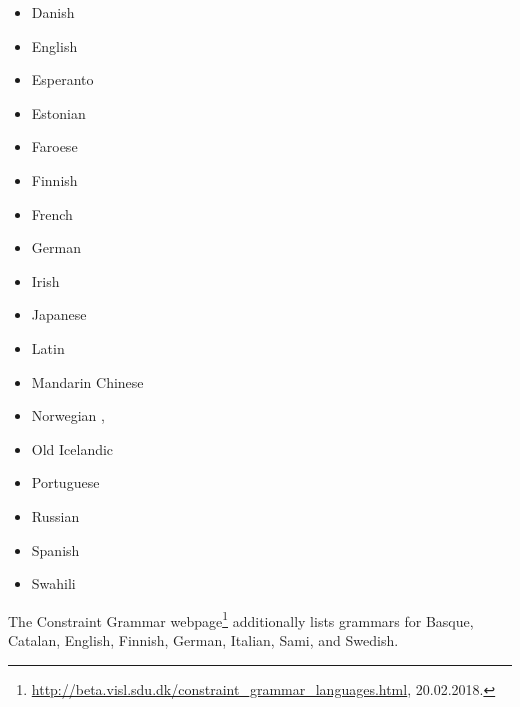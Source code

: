 \begin{itemize}
\item Danish       \citep{Bick2001a-u,BN2007a-u}
\item English     \citep{MIF85a,SN86a,LR87a,Hudson89a,ST91a-u,VHA92a-u,IKKLP92a-u,Coch96a}
\item Esperanto \citep{Bick2009a-u} 
\item Estonian   \citep*{Mueuerisep99a-u,MPMKRU2003a-u}
\item Faroese     \citep{Trosterud2009a-u}
\item Finnish     \citep*{NJL84a-u,JLV86a-u}
\item French       \citep{IKKLP92a-u,Coch96a,Bick2010a-u}
\item German       \citep{Hellwig86a-u,Coch96a,HKMS98a-u,MS98c-u,Hellwig2003a,Hellwig2006a,GK2001a}
\item Irish         \citep{DvG2006a-u}
\item Japanese   \citep*{MIF85a}
\item Latin         \citep{Covington90a}
\item Mandarin Chinese \citep{LW2006a-u,Liu2009a-u}
\item Norwegian               \citep*{HBN2000a-u},
\item Old Icelandic       \citep{Maas77a}
\item Portuguese             \citep{Bick2003a-u} 
\item Russian                   \citep{HZ60a-u,Melcuk64a-u,Covington90a}
\item Spanish                   \citep{Coch96a,Bick2006a-u}
\item Swahili                   \citep{Hurskainen2006a-u}
\end{itemize}
The Constraint Grammar webpage\footnote{%
  \url{http://beta.visl.sdu.dk/constraint_grammar_languages.html}, 20.02.2018.
} additionally lists grammars for
Basque,
Catalan,
English,
Finnish,
German,
Italian,
Sami, and
Swedish.
%
